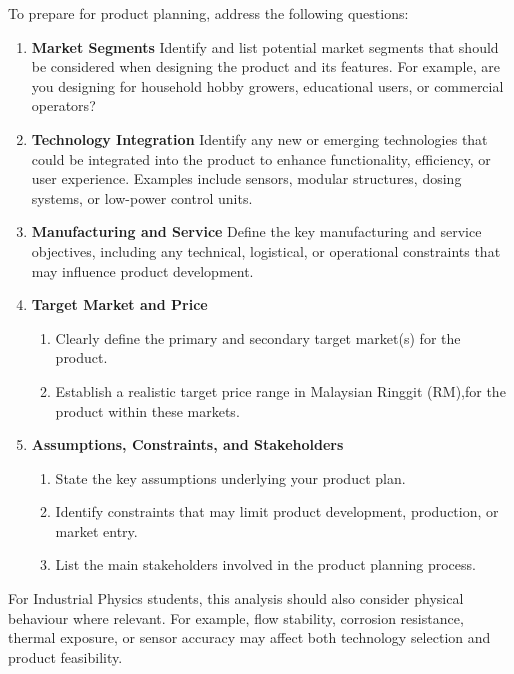 To prepare for product planning, address the following questions:

\begin{enumerate}

\item \textbf{Market Segments}
Identify and list potential market segments that should be considered when designing the product and its features. For example, are you designing for household hobby growers, educational users, or commercial operators?

\item \textbf{Technology Integration}
Identify any new or emerging technologies that could be integrated into the product to enhance functionality, efficiency, or user experience. Examples include sensors, modular structures, dosing systems, or low-power control units.

\item \textbf{Manufacturing and Service}
Define the key manufacturing and service objectives, including any technical, logistical, or operational constraints that may influence product development.

\item \textbf{Target Market and Price}
\begin{enumerate}
    \item Clearly define the primary and secondary target market(s) for the product.
    \item Establish a realistic target price range in Malaysian Ringgit (RM),for the product within these markets.
\end{enumerate}

\item \textbf{Assumptions, Constraints, and Stakeholders}
\begin{enumerate}
    \item State the key assumptions underlying your product plan.
    \item Identify constraints that may limit product development, production, or market entry.
    \item List the main stakeholders involved in the product planning process.
\end{enumerate}

\end{enumerate}


For Industrial Physics students, this analysis should also consider physical behaviour where relevant. For example, flow stability, corrosion resistance, thermal exposure, or sensor accuracy may affect both technology selection and product feasibility.

